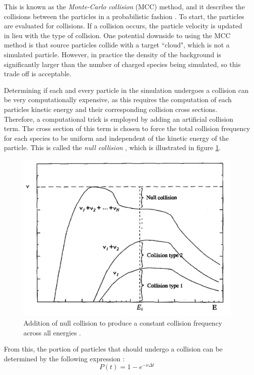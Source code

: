 This is known as the \textit{Monte-Carlo collision} (MCC) method, and it describes the collisions between the particles in a probabilistic fashion \cite{Iza2007}. To start, the particles are evaluated for collisions. If a collision occurs, the particle velocity is updated in lieu with the type of collision. One potential downside to using the MCC method is that source particles collide with a target ``cloud", which is not a simulated particle. However, in practice the density of the background is significantly larger than the number of charged species being simulated, so this trade off is acceptable.

Determining if each and every particle in the simulation undergoes a collision can be very computationally expensive, as this requires the computation of each particles kinetic energy and their corresponding collision cross sections. Therefore, a computational trick is employed by adding an artificial collision term. The cross section of this term is chosen to force the total collision frequency for each species to be uniform and independent of the kinetic energy of the particle. This is called the \textit{null collision} \cite{Iza2007}, which is illustrated in figure \ref{fig:null_collision}.

\begin{figure}[h!]
	\centering
	\includegraphics[width=0.6\linewidth]{particle_in_cell/figures/null_collision_option_1.png}
	\caption{Addition of null collision to produce a constant collision frequency across all energies \cite{Vahedi1995}.}
	\label{fig:null_collision}
\end{figure} 

From this, the portion of particles that should undergo a collision can be determined by the following expression \cite{Vahedi1995}:
\begin{equation}
	P(t) = 1 - e^{-\nu \Delta t}
	\label{eq:null_collisions}
\end{equation}

